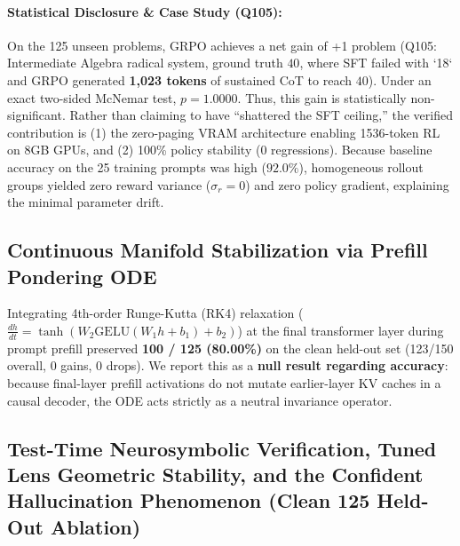 \documentclass[11pt,a4paper]{article}
\begin{document}
\paragraph{Statistical Disclosure \& Case Study (Q105):}
On the 125 unseen problems, GRPO achieves a net gain of +1 problem (Q105: Intermediate Algebra radical system, ground truth $40$, where SFT failed with `18` and GRPO generated \textbf{1,023 tokens} of sustained CoT to reach $\boxed{40}$). Under an exact two-sided McNemar test, $p = 1.0000$. Thus, this gain is statistically non-significant. Rather than claiming to have ``shattered the SFT ceiling,'' the verified contribution is (1) the zero-paging VRAM architecture enabling 1536-token RL on 8GB GPUs, and (2) 100\% policy stability (0 regressions). Because baseline accuracy on the 25 training prompts was high ($92.0\%$), homogeneous rollout groups yielded zero reward variance ($\sigma_r = 0$) and zero policy gradient, explaining the minimal parameter drift.

\subsection{Continuous Manifold Stabilization via Prefill Pondering ODE}

Integrating 4th-order Runge-Kutta (RK4) relaxation ($\frac{dh}{dt} = \tanh(W_2 \mathrm{GELU}(W_1 h + b_1) + b_2)$) at the final transformer layer during prompt prefill preserved \textbf{100 / 125 (80.00\%)} on the clean held-out set (123/150 overall, 0 gains, 0 drops). We report this as a \textbf{null result regarding accuracy}: because final-layer prefill activations do not mutate earlier-layer KV caches in a causal decoder, the ODE acts strictly as a neutral invariance operator.

\subsection{Test-Time Neurosymbolic Verification, Tuned Lens Geometric Stability, and the Confident Hallucination Phenomenon (Clean 125 Held-Out Ablation)}
\end{document}
